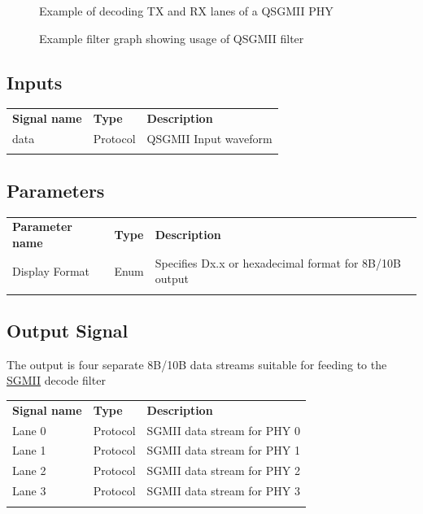 \begin{figure}[h]
\centering
{}
\caption{Example of decoding TX and RX lanes of a QSGMII PHY}
\label{filter_qsgmii}
\end{figure}

\begin{figure}[h]
\centering
{}
\caption{Example filter graph showing usage of QSGMII filter}
\label{filter_qsgmii}
\end{figure}

\FloatBarrier

\subsection{Inputs}

\begin{tabularx}{16cm}{llX}
\thickhline
\textbf{Signal name} & \textbf{Type} & \textbf{Description} \\
\thickhline
data & Protocol & QSGMII Input waveform\\
\thickhline
\end{tabularx}

\subsection{Parameters}

\begin{tabularx}{16cm}{llX}
\thickhline
\textbf{Parameter name} & \textbf{Type} & \textbf{Description} \\
\thickhline
Display Format & Enum & Specifies Dx.x or hexadecimal format for 8B/10B output\\
\thickhline
\end{tabularx}

\subsection{Output Signal}

The output is four separate 8B/10B data streams suitable for feeding to the \hyperref[filter:sgmii]{SGMII} decode
filter

\begin{tabularx}{16cm}{llX}
\thickhline
\textbf{Signal name} & \textbf{Type} & \textbf{Description} \\
\thickhline
Lane 0 & Protocol & SGMII data stream for PHY 0\\
\thinhline
Lane 1 & Protocol & SGMII data stream for PHY 1\\
\thinhline
Lane 2 & Protocol & SGMII data stream for PHY 2\\
\thinhline
Lane 3 & Protocol & SGMII data stream for PHY 3\\
\thickhline
\end{tabularx}

